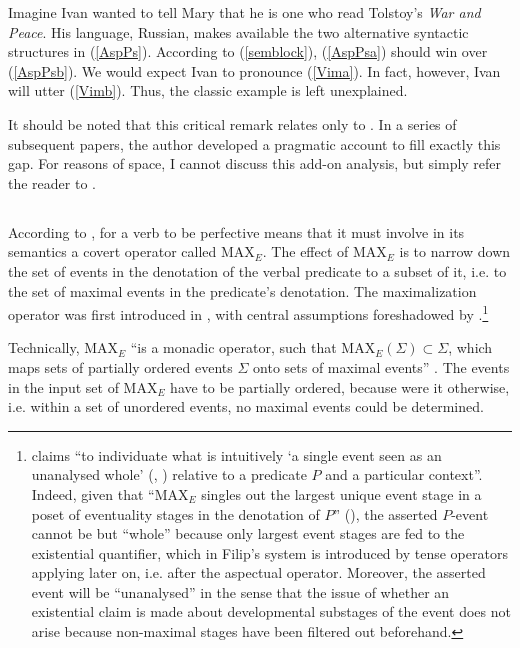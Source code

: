 \documentclass[output=paper,colorlinks,citecolor=brown]{langscibook}
\begin{document}
\noindent Imagine Ivan wanted to tell Mary that he is one who read Tolstoy's \textit{War and Peace}. His language, Russian, makes available the two alternative syntactic structures in (\ref{AspPs}). 
According to (\ref{semblock}), (\ref{AspPsa}) should win over (\ref{AspPsb}). We would expect Ivan to pronounce (\ref{Vima}). In fact, however, Ivan will utter (\ref{Vimb}).  
Thus, the classic example is left unexplained.
 
It should be noted that this critical remark relates only to \citet{Gronn2004}. In a series of subsequent papers, the author developed a pragmatic account to fill exactly this gap. For reasons of space, I cannot discuss this add-on analysis, but simply refer the reader to \citet{Gronn2006, GronnA2008, Gronn08}.   

\subsection{\citet{Filip2000,Filip2008,Filip2017}} \label{ssec:filip}
According to \citet{Filip2008}, for a verb to be perfective means that it must involve in its semantics a covert operator called MAX$_E$. The effect of MAX$_E$ is to narrow down the set of events in the denotation of the verbal predicate to a subset of it, i.e. to the set of maximal events in the predicate's denotation. 
The maximalization operator 
was first introduced in 
\citet{FilipRothstein2006}, with central assumptions foreshadowed by \citet{Filip2000}.\footnote{\citet[182]{Filip2017} claims ``to individuate what is intuitively `a single event seen as an unanalysed whole' (\citealt{Comrie1976}, \citealt{Dahl1985}) relative to a predicate $P$ and a particular context''.
Indeed, given that ``MAX$_E$ singles out the largest unique event stage in a poset of eventuality stages in the denotation of $P$'' (\citealt[182]{Filip2017}), the asserted $P$-event cannot be but ``whole'' because only largest event stages are fed to the existential quantifier, which in Filip's system is introduced by tense operators applying later on, i.e. after the aspectual operator. Moreover, the asserted event will be ``unanalysed'' in the sense that the issue of whether an existential claim is made about developmental substages of the event does not arise because non-maximal stages have been filtered out beforehand.} 

Technically, MAX$_E$ ``is a monadic operator, such that MAX$_E(\Sigma)\subset \Sigma$, which maps sets of partially ordered events $\Sigma$ onto sets of maximal events'' \citep[219]{Filip2008}. 
The events in the input set of MAX$_E$ have to be partially ordered, because were it otherwise, i.e. within a set of unordered events, no maximal events could be determined.  
\end{document}
